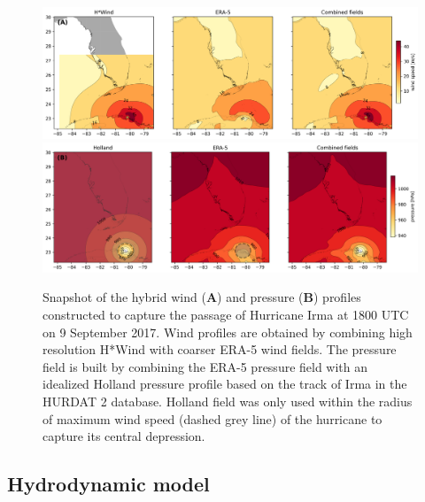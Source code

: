 \documentclass[preprint,12pt,authoryear]{elsarticle}
\begin{document}
\begin{figure}
    \centering
    \includegraphics[width=.99\textwidth]{fig/hwind_vs_era.png}
    \includegraphics[width=.99\textwidth]{fig/holland_vs_era.png}
    \caption{Snapshot of the hybrid wind (\textbf{A}) and pressure (\textbf{B}) profiles constructed to capture the passage of Hurricane Irma at 1800 UTC on 9 September 2017. Wind profiles are obtained by combining high resolution H*Wind with coarser ERA-5 wind fields. The pressure field is built by combining the ERA-5 pressure field with an idealized Holland pressure profile based on the track of Irma in the HURDAT 2 database. Holland field was only used within the radius of maximum wind speed (dashed grey line) of the hurricane to capture its central depression. }
    \label{fig:atm}
\end{figure}

\subsection{Hydrodynamic model}
\end{document}
